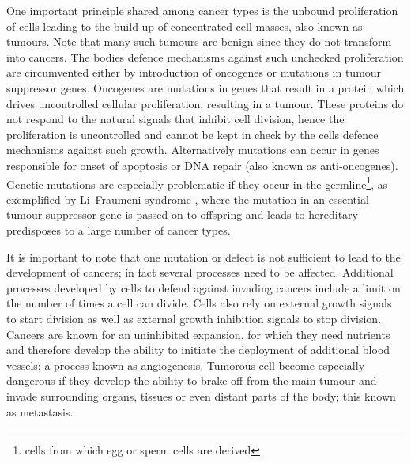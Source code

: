One important principle shared among cancer types is the unbound proliferation of cells leading to the build up of concentrated cell masses, also known as tumours. Note that many such tumours are benign since they do not transform into cancers. The bodies defence mechanisms against such unchecked proliferation are circumvented either by introduction of oncogenes or mutations in tumour suppressor genes. Oncogenes are mutations in genes that result in a protein which drives uncontrolled cellular proliferation, resulting in a tumour. These proteins do not respond to the natural signals that inhibit cell division, hence the proliferation is uncontrolled and cannot be kept in check by the cells defence mechanisms against such growth. Alternatively mutations can occur in genes responsible for onset of apoptosis or DNA repair (also known as anti-oncogenes). Genetic mutations are especially problematic if they occur in the germline\footnote{cells from which egg or sperm cells are derived}, as exemplified by Li–Fraumeni syndrome \citep{Li:1969kl}, where the mutation in an essential tumour suppressor gene is passed on to offspring and leads to hereditary predisposes to a large number of cancer types.

It is important to note that one mutation or defect is not sufficient to lead to the development of cancers; in fact several processes need to be affected. Additional processes developed by cells to defend against invading cancers include a limit on the number of times a cell can divide. Cells also rely on external growth signals to start division as well as external growth inhibition signals to stop division. Cancers are known for an uninhibited expansion, for which they need nutrients and therefore develop the ability to initiate the deployment of additional blood vessels; a process known as angiogenesis. Tumorous cell become especially dangerous if they develop the ability to brake off from the main tumour and invade surrounding organs, tissues or even distant parts of the body; this known as metastasis.

